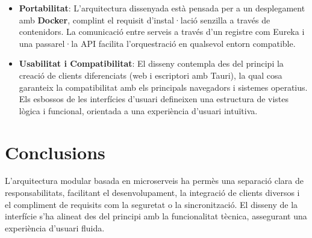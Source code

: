 \begin{itemize}
    \item \textbf{Portabilitat}: L'arquitectura dissenyada està pensada per a un desplegament amb \textbf{Docker}, complint el requisit d'instal·lació senzilla a través de contenidors. La comunicació entre serveis a través d'un registre com Eureka i una passarel·la API facilita l'orquestració en qualsevol entorn compatible.

    \item \textbf{Usabilitat i Compatibilitat}: El disseny contempla des del principi la creació de clients diferenciats (web i escriptori amb Tauri), la qual cosa garanteix la compatibilitat amb els principals navegadors i sistemes operatius. Els esbossos de les interfícies d'usuari defineixen una estructura de vistes lògica i funcional, orientada a una experiència d'usuari intuïtiva.
\end{itemize}

\section{Conclusions}
L'arquitectura modular basada en microserveis ha permès una separació clara de responsabilitats, facilitant el desenvolupament, la integració de clients diversos i el compliment de requisits com la seguretat o la sincronització. El disseny de la interfície s'ha alineat des del principi amb la funcionalitat tècnica, assegurant una experiència d'usuari fluida.
